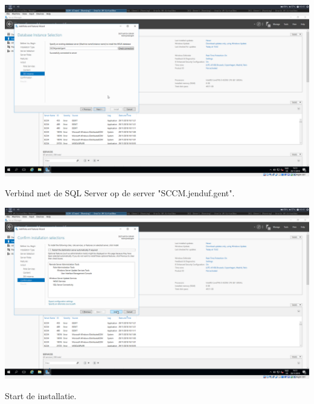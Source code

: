 \documentclass[a4paper]{article}
\begin{document}
\begin{center}
	\includegraphics[width=15cm]{Pictures/SCCM/5/1543504391.png}
	
	Verbind met de SQL Server op de server "SCCM.jenduf.gent".
\end{center}
\begin{center}
	\includegraphics[width=15cm]{Pictures/SCCM/5/1543504396.png}
	
	Start de installatie.
\end{center}
\end{document}
